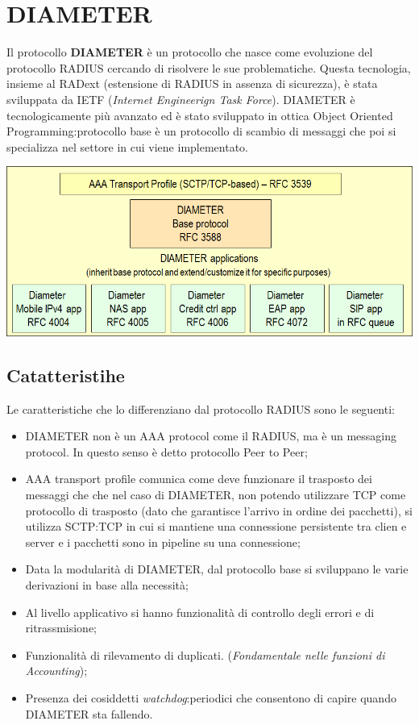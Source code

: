 \documentclass{book}
\theoremstyle{remark}
\begin{document}
\chapter{DIAMETER}
Il protocollo \textbf{DIAMETER} è un protocollo che nasce come evoluzione del protocollo RADIUS cercando di risolvere le sue problematiche\@. Questa tecnologia, insieme al RADext (estensione di RADIUS in assenza di sicurezza), è stata sviluppata da IETF (\emph{Internet Engineerign Task Force})\@. DIAMETER è tecnologicamente più avanzato ed è stato sviluppato in ottica Object Oriented Programming:\@il protocollo base è un protocollo di scambio di messaggi che poi si specializza nel settore in cui viene implementato\@.\begin{center}
	\includegraphics[scale=0.4]{DIAMETERALL.png}
\end{center}
\section{Catatteristihe}
Le caratteristiche che lo differenziano dal protocollo RADIUS sono le seguenti:\begin{itemize}
	\item DIAMETER non è un AAA protocol come il RADIUS, ma è un messaging protocol\@. In questo senso è detto protocollo Peer to Peer;\@
	\item AAA transport profile comunica come deve funzionare il trasposto dei messaggi che che nel caso di DIAMETER, non potendo utilizzare TCP come protocollo di trasposto (dato che garantisce l'arrivo in ordine dei pacchetti), si utilizza SCTP:\@protocollo TCP in cui si mantiene una connessione persistente tra clien e server e i pacchetti sono in pipeline su una connessione;\@
	\item Data la modularità di DIAMETER, dal protocollo base si sviluppano le varie derivazioni in base alla necessità;\@
	\item Al livello applicativo si hanno funzionalità di controllo degli errori e di ritrassmisione;\@
	\item Funzionalità di rilevamento di duplicati\@. (\emph{Fondamentale nelle funzioni di Accounting});\@
	\item Presenza dei cosiddetti \emph{watchdog}:\@pacchetti periodici che consentono di capire quando DIAMETER sta fallendo\@.
\end{itemize}
\end{document}
